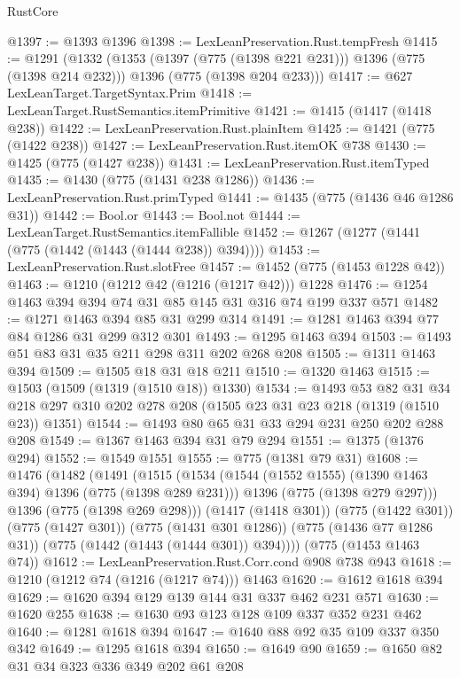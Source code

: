 \begin{lexlean}{RustCore}
\begin{coremodule}
@1397 := @1393 @1396
@1398 := LexLeanPreservation.Rust.tempFresh
@1415 := @1291
    (@1332
      (@1353 (@1397 (@775 (@1398 @221 @231))) @1396 (@775 (@1398 @214 @232)))
      @1396
      (@775 (@1398 @204 @233)))
@1417 := @627 LexLeanTarget.TargetSyntax.Prim
@1418 := LexLeanTarget.RustSemantics.itemPrimitive
@1421 := @1415 (@1417 (@1418 @238))
@1422 := LexLeanPreservation.Rust.plainItem
@1425 := @1421 (@775 (@1422 @238))
@1427 := LexLeanPreservation.Rust.itemOK @738
@1430 := @1425 (@775 (@1427 @238))
@1431 := LexLeanPreservation.Rust.itemTyped
@1435 := @1430 (@775 (@1431 @238 @1286))
@1436 := LexLeanPreservation.Rust.primTyped
@1441 := @1435 (@775 (@1436 @46 @1286 @31))
@1442 := Bool.or
@1443 := Bool.not
@1444 := LexLeanTarget.RustSemantics.itemFallible
@1452 := @1267 (@1277 (@1441 (@775 (@1442 (@1443 (@1444 @238)) @394))))
@1453 := LexLeanPreservation.Rust.slotFree
@1457 := @1452 (@775 (@1453 @1228 @42))
@1463 := @1210 (@1212 @42 (@1216 (@1217 @42))) @1228
@1476 := @1254 @1463 @394 @394 @74 @31 @85 @145 @31 @316 @74 @199 @337 @571
@1482 := @1271 @1463 @394 @85 @31 @299 @314
@1491 := @1281 @1463 @394 @77 @84 @1286 @31 @299 @312 @301
@1493 := @1295 @1463 @394
@1503 := @1493 @51 @83 @31 @35 @211 @298 @311 @202 @268 @208
@1505 := @1311 @1463 @394
@1509 := @1505 @18 @31 @18 @211
@1510 := @1320 @1463
@1515 := @1503 (@1509 (@1319 (@1510 @18)) @1330)
@1534 := @1493
    @53
    @82
    @31
    @34
    @218
    @297
    @310
    @202
    @278
    @208
    (@1505 @23 @31 @23 @218 (@1319 (@1510 @23)) @1351)
@1544 := @1493 @80 @65 @31 @33 @294 @231 @250 @202 @288 @208
@1549 := @1367 @1463 @394 @31 @79 @294
@1551 := @1375 (@1376 @294)
@1552 := @1549 @1551
@1555 := @775 (@1381 @79 @31)
@1608 := @1476
    (@1482
      (@1491
        (@1515
          (@1534
            (@1544 (@1552 @1555) (@1390 @1463 @394) @1396 (@775 (@1398 @289 @231)))
            @1396
            (@775 (@1398 @279 @297)))
          @1396
          (@775 (@1398 @269 @298)))
        (@1417 (@1418 @301))
        (@775 (@1422 @301))
        (@775 (@1427 @301))
        (@775 (@1431 @301 @1286))
        (@775 (@1436 @77 @1286 @31))
        (@775 (@1442 (@1443 (@1444 @301)) @394))))
    (@775 (@1453 @1463 @74))
@1612 := LexLeanPreservation.Rust.Corr.cond @908 @738 @943
@1618 := @1210 (@1212 @74 (@1216 (@1217 @74))) @1463
@1620 := @1612 @1618 @394
@1629 := @1620 @394 @129 @139 @144 @31 @337 @462 @231 @571
@1630 := @1620 @255
@1638 := @1630 @93 @123 @128 @109 @337 @352 @231 @462
@1640 := @1281 @1618 @394
@1647 := @1640 @88 @92 @35 @109 @337 @350 @342
@1649 := @1295 @1618 @394
@1650 := @1649 @90
@1659 := @1650 @82 @31 @34 @323 @336 @349 @202 @61 @208

\end{coremodule}
\end{lexlean}
